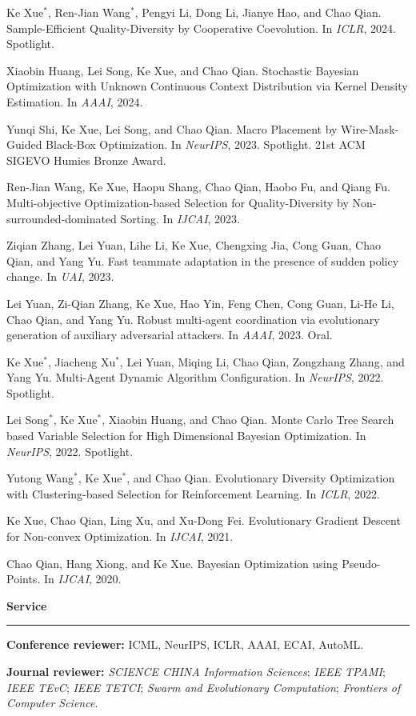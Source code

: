 \documentclass[11pt,a4paper]{article}
\newcommand{\cvsection}[1]{%
  \vspace{0.65em}%
  \noindent\textbf{\large #1}\\[-0.15em]
  \rule{\textwidth}{0.4pt}%
  \vspace{0.4em}%
}
\begin{document}
\begin{cvbullet}
  \item Ke Xue$^*$, Ren-Jian Wang$^*$, Pengyi Li, Dong Li, Jianye Hao, and Chao Qian. Sample-Efficient Quality-Diversity by Cooperative Coevolution. In \textit{ICLR}, 2024. Spotlight.
  \item Xiaobin Huang, Lei Song, Ke Xue, and Chao Qian. Stochastic Bayesian Optimization with Unknown Continuous Context Distribution via Kernel Density Estimation. In \textit{AAAI}, 2024.
  \item Yunqi Shi, Ke Xue, Lei Song, and Chao Qian. Macro Placement by Wire-Mask-Guided Black-Box Optimization. In \textit{NeurIPS}, 2023. Spotlight. 21st ACM SIGEVO Humies Bronze Award.
  \item Ren-Jian Wang, Ke Xue, Haopu Shang, Chao Qian, Haobo Fu, and Qiang Fu. Multi-objective Optimization-based Selection for Quality-Diversity by Non-surrounded-dominated Sorting. In \textit{IJCAI}, 2023.
  \item Ziqian Zhang, Lei Yuan, Lihe Li, Ke Xue, Chengxing Jia, Cong Guan, Chao Qian, and Yang Yu. Fast teammate adaptation in the presence of sudden policy change. In \textit{UAI}, 2023.
  \item Lei Yuan, Zi-Qian Zhang, Ke Xue, Hao Yin, Feng Chen, Cong Guan, Li-He Li, Chao Qian, and Yang Yu. Robust multi-agent coordination via evolutionary generation of auxiliary adversarial attackers. In \textit{AAAI}, 2023. Oral.
  \item Ke Xue$^*$, Jiacheng Xu$^*$, Lei Yuan, Miqing Li, Chao Qian, Zongzhang Zhang, and Yang Yu. Multi-Agent Dynamic Algorithm Configuration. In \textit{NeurIPS}, 2022. Spotlight.
  \item Lei Song$^*$, Ke Xue$^*$, Xiaobin Huang, and Chao Qian. Monte Carlo Tree Search based Variable Selection for High Dimensional Bayesian Optimization. In \textit{NeurIPS}, 2022. Spotlight.
  \item Yutong Wang$^*$, Ke Xue$^*$, and Chao Qian. Evolutionary Diversity Optimization with Clustering-based Selection for Reinforcement Learning. In \textit{ICLR}, 2022.
  \item Ke Xue, Chao Qian, Ling Xu, and Xu-Dong Fei. Evolutionary Gradient Descent for Non-convex Optimization. In \textit{IJCAI}, 2021.
  \item Chao Qian, Hang Xiong, and Ke Xue. Bayesian Optimization using Pseudo-Points. In \textit{IJCAI}, 2020.
\end{cvbullet}

\cvsection{Service}
\begin{cvbullet}
  \item \textbf{Conference reviewer:} ICML, NeurIPS, ICLR, AAAI, ECAI, AutoML.
  \item \textbf{Journal reviewer:} \textit{SCIENCE CHINA Information Sciences}; \textit{IEEE TPAMI}; \textit{IEEE TEvC}; \textit{IEEE TETCI}; \textit{Swarm and Evolutionary Computation}; \textit{Frontiers of Computer Science}.
\end{cvbullet}
\end{document}
